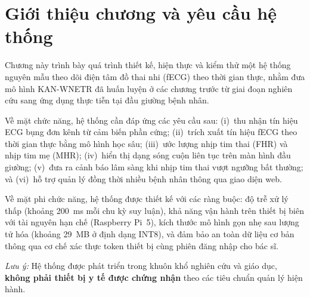 \documentclass[../DoAn.tex]{subfiles}
\begin{document}

\section{Giới thiệu chương và yêu cầu hệ thống}

Chương này trình bày quá trình thiết kế, hiện thực và kiểm thử một hệ thống nguyên mẫu theo dõi điện tâm đồ thai nhi (fECG) theo thời gian thực, nhằm đưa mô hình KAN-WNETR đã huấn luyện ở các chương trước từ giai đoạn nghiên cứu sang ứng dụng thực tiễn tại đầu giường bệnh nhân.

Về mặt chức năng, hệ thống cần đáp ứng các yêu cầu sau: (i)~thu nhận tín hiệu ECG bụng đơn kênh từ cảm biến phần cứng; (ii)~trích xuất tín hiệu fECG theo thời gian thực bằng mô hình học sâu; (iii)~ước lượng nhịp tim thai (FHR) và nhịp tim mẹ (MHR); (iv)~hiển thị dạng sóng cuộn liên tục trên màn hình đầu giường; (v)~đưa ra cảnh báo lâm sàng khi nhịp tim thai vượt ngưỡng bất thường; và (vi)~hỗ trợ quản lý đồng thời nhiều bệnh nhân thông qua giao diện web.

Về mặt phi chức năng, hệ thống được thiết kế với các ràng buộc: độ trễ xử lý thấp (khoảng 200~ms mỗi chu kỳ suy luận), khả năng vận hành trên thiết bị biên với tài nguyên hạn chế (Raspberry Pi~5), kích thước mô hình gọn nhẹ sau lượng tử hóa (khoảng 29~MB ở định dạng INT8), và đảm bảo an toàn dữ liệu cơ bản thông qua cơ chế xác thực token thiết bị cùng phiên đăng nhập cho bác sĩ.

\textit{Lưu ý:} Hệ thống được phát triển trong khuôn khổ nghiên cứu và giáo dục, \textbf{không phải thiết bị y tế được chứng nhận} theo các tiêu chuẩn quản lý hiện hành.
\end{document}
